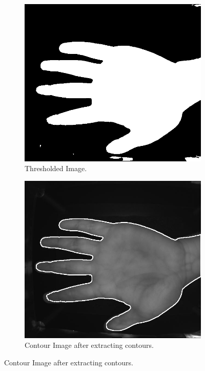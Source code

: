 \begin{enumerate}
    \begin{figure}[!ht]
        \centering
        \begin{subfigure}[t]{0.48\columnwidth}
            \includegraphics[width=\textwidth]{./images/preprocessing/thresholded_image.png}
            \caption{Thresholded Image.} 
            \label{fig:thresholded_image}
        \end{subfigure}
        \hfill
        \begin{subfigure}[t]{0.48\columnwidth}
            \includegraphics[width=\textwidth]{./images/preprocessing/contour_image.png}
            \caption{Contour Image after extracting contours.}
            \label{fig:contour_image}
        \end{subfigure}
    \end{figure}


\end{enumerate}
